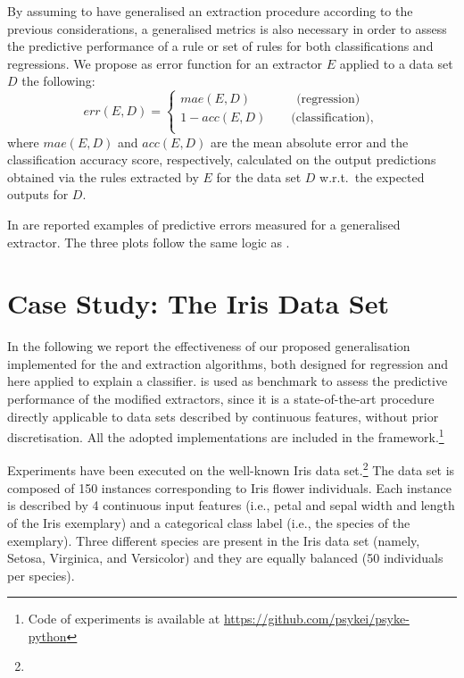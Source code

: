 \documentclass[
]{ceurart}
\begin{document}
By assuming to have generalised an extraction procedure according to the previous considerations, a generalised metrics is also necessary in order to assess the predictive performance of a rule or set of rules for both classifications and regressions.
%
We propose as error function for an extractor $E$ applied to a data set $D$ the following:
%
\begin{equation}
	err(E, D) = 
	\begin{cases}
		mae(E, D) \text{~~~~~~~~~~~(regression)}\\
		1 - acc(E, D) \text{~~~~~~(classification),}\\
	\end{cases}\,\label{eq:error}
\end{equation}
%
where $mae(E, D)$ and $acc(E, D)$ are the mean absolute error and the classification accuracy score, respectively, calculated on the output predictions obtained via the rules extracted by $E$ for the data set $D$ w.r.t.\ the expected outputs for $D$.



In  are reported examples of predictive errors measured for a generalised extractor.
%
The three plots follow the same logic as .

\section{Case Study: The Iris Data Set}\label{sec:experiments}

In the following we report the effectiveness of our proposed generalisation implemented for the \iter{} and \gridex{} extraction algorithms, both designed for regression and here applied to explain a classifier.
%
\cart{} is used as benchmark to assess the predictive performance of the modified extractors, since it is a state-of-the-art procedure directly applicable to data sets described by continuous features, without prior discretisation.
%
All the adopted implementations are included in the \psyke{} framework.\footnote{Code of experiments is available at \url{https://github.com/psykei/psyke-python}}

Experiments have been executed on the well-known Iris data set.\footnote{}
%
The data set is composed of 150 instances corresponding to Iris flower individuals.
%
Each instance is described by 4 continuous input features (i.e., petal and sepal width and length of the Iris exemplary) and a categorical class label (i.e., the species of the exemplary).
%
Three different species are present in the Iris data set (namely, Setosa, Virginica, and Versicolor) and they are equally balanced (50 individuals per species).
\end{document}

